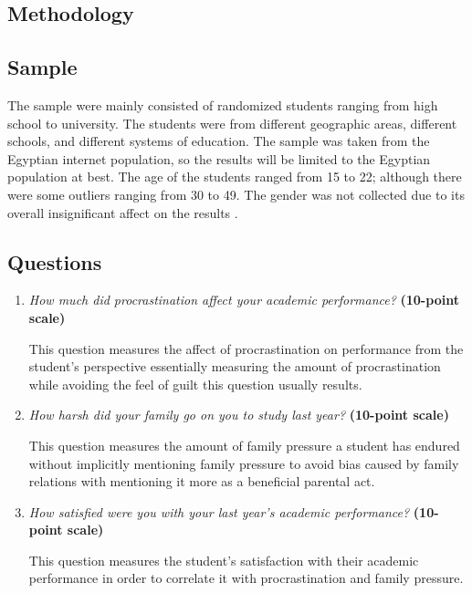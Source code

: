 \documentclass[12pt]{report}
\begin{document}
\begin{multicols}{2}
    
\section{Methodology}

\subsection{Sample}

The sample were mainly consisted of randomized students ranging from high school
to university. The students were from different geographic areas, different
schools, and different systems of education. The sample was taken from the
Egyptian internet population, so the results will be limited to the Egyptian
population at best. The age of the students ranged from 15 to 22; although there
were some outliers ranging from 30 to 49. The gender was not collected due to
its overall insignificant affect on the results \parencite{hashmat2008factors}.

\subsection{Questions}

\begin{enumerate}[wide, labelwidth=!, labelindent=0pt]

    \item \textit{How much did procrastination affect your academic performance?}
\textbf{(10-point scale)}

This question measures the affect of procrastination on performance from the
student's perspective essentially measuring the amount of procrastination
while avoiding the feel of guilt this question usually results.

\item \textit{How harsh did your family go on you to study last year?}
\textbf{(10-point scale)}

This question measures the amount of family pressure a student has endured without
implicitly mentioning family pressure to avoid bias caused by family relations
with mentioning it more as a beneficial parental act.

\item \textit{How satisfied were you with your last year's academic
performance?}
\textbf{(10-point scale)}

This question measures the student's satisfaction with their academic
performance in order to correlate it with procrastination and family pressure.


\end{enumerate}
\end{multicols}
\end{document}
